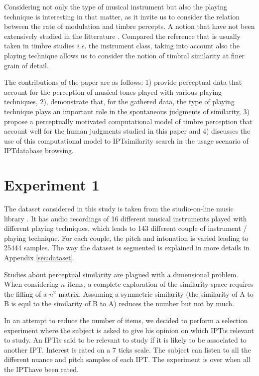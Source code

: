 \documentclass{article}
\newcommand{\ipt}{IPT}
\begin{document}
Considering not only the type of musical instrument but also the playing technique is interesting in that matter, as it invite us to consider the relation between the rate of modulation and timbre percepts. A notion that have not been extensively studied in the litterature \cite{burred2010dynamic}. Compared the reference that is usually taken in timbre studies \textit{i.e.} the instrument class, taking into account also the playing technique allows us to consider the notion of timbral similarity at finer grain of detail.

The contributions of the paper are as follows: 1) provide perceptual data that account for the perception of musical tones played with various playing techniques, 2), demonstrate that, for the gathered data, the type of playing technique plays an important role in the spontaneous judgments of similarity, 3) propose a perceptually motivated computational model of timbre perception that account well for the human judgments studied in this paper and 4) discusses the use of this computational model to \ipt similarity search in the usage scenario of \ipt database browsing.

\section{Experiment 1}\label{sec:xp1}

The dataset considered in this study is taken from the studio-on-line music library  \cite{peeters2000instrument}. It has audio recordings of 16 different musical instruments played with different playing techniques, which leads to 143 different couple of instrument / playing technique. For each couple, the pitch and intonation is varied leading to 25444 samples. The way the dataset is segmented is explained in more details in Appendix \ref{sec:dataset}.

Studies about perceptual similarity are plagued with a dimensional problem. When considering $n$ items, a complete exploration of the similarity space requires the filling of a $n^2$ matrix. Assuming a symmetric similarity (the similarity of A to B is equl to the similarity of B to A) reduces the number but not by much.

In an attempt to reduce the number of items, we decided to perform a selection experiment where the subject is asked to give his opinion on which \ipt is relevant to study. An \ipt is said to be relevant to study if it is likely to be associated to another \ipt. Interest is rated on a 7 ticks scale. The subject can listen to all the different nuance and pitch samples of each \ipt. The experiment is over when all the \ipt have been rated.
\end{document}

